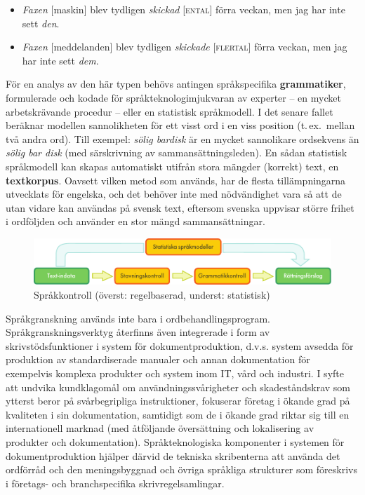\begin{multicols}{2}
\begin{itemize}
\item \textit{Faxen} [maskin] blev tydligen \textit{skickad} [\textsc{ental}] förra veckan, men jag har inte sett \textit{den}.
\item \textit{Faxen} [meddelanden] blev tydligen \textit{skickade} [\textsc{flertal}] förra veckan, men jag har inte sett \textit{dem}.
\end{itemize}

För en analys av den här typen behövs antingen språkspecifika
\textbf{grammatiker}, formulerade och kodade för
språkteknologimjukvaran av experter -- en mycket arbetskrävande
procedur -- eller en statistisk språkmodell. I det senare fallet
beräknar modellen sannolikheten för ett visst ord i en viss position
(t.\,ex.~mellan två andra ord). Till exempel: \textit{sölig bardisk} är
en mycket sannolikare ordsekvens än \textit{sölig bar disk} (med
särskrivning av sammansättningsleden). En sådan statistisk språkmodell
kan skapas automatiskt utifrån stora mängder (korrekt) text, en
\textbf{textkorpus}. Oavsett vilken metod som används, har de flesta
tillämpningarna utvecklats för engelska, och det behöver inte med
nödvändighet vara så att de utan vidare kan användas på svensk text,
eftersom svenska uppvisar större frihet i ordföljden och använder en
stor mängd sammansättningar.


\begin{figure}[htb]
  \center
  \includegraphics[width=\textwidth]{../_media/swedish/language_checking}
  \caption{Språkkontroll (överst: regelbaserad, underst: statistisk)}
  \label{fig:langcheckingaarch_sv}
\end{figure}

Språkgranskning används inte bara i
ordbehandlingsprogram. Språkgranskningsverktyg återfinns även
integrerade i form av skrivstödsfunktioner i system för
dokumentproduktion, d.v.s. system avsedda för produktion av
standardiserade manualer och annan dokumentation för exempelvis
komplexa produkter och system inom IT, vård och industri. I syfte att
undvika kundklagomål om användningssvårigheter och skadeståndskrav som
ytterst beror på svårbegripliga instruktioner, fokuserar företag i
ökande grad på kvaliteten i sin dokumentation, samtidigt som de i
ökande grad riktar sig till en internationell marknad (med åtföljande
översättning och lokalisering av produkter och
dokumentation). Språkteknologiska komponenter i systemen för
dokumentproduktion hjälper därvid de tekniska skribenterna att använda
det ordförråd och den meningsbyggnad och övriga språkliga strukturer
som föreskrivs i företags- och branchspecifika skrivregelsamlingar.


\end{multicols}
